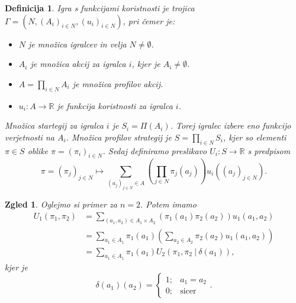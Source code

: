 \documentclass[10pt, a4paper]{article}
\newtheorem{defi}[izr]{Definicija}
\newenvironment{noticeB}{%
  \tcolorbox[%
  notitle,
  empty,
  enhanced,  %
  breakable,
  coltext=black,
  colback=white, 
  fontupper=\rmfamily,
  parbox=false,
  noparskip,
  sharp corners,
  boxrule=-1pt,  %
  frame hidden,
  left=7pt,  %
  right=7pt,
  top=5pt,
  bottom=5pt,
  before skip=2.5ex plus 2pt,
  after skip=2.5ex plus 2pt,
  borderline west = {1.5pt}{-0.1pt}{blue!30!black}, %
  overlay unbroken and last={%
    \draw[color=black, line width=1.25pt]
    ($(frame.south west)+(1.pt, -0.1pt)$) -- ++(2em, 0);
  }
  ]}
{\endtcolorbox}
\newenvironment{definicija}{\begin{defi}\begin{noticeB}}{%
    \end{noticeB}\end{defi}}
\newtheorem{zgled}[izr]{Zgled}
\newcommand{\R}{\mathbb {R}}
\begin{document}
\begin{definicija}
  Igra s funkcijami koristnosti je trojica $\Gamma = (N, (A_i)_{i \in N}, (u_i)_{i \in N})$,
  pri čemer je:
  \begin{itemize}
    \item $N$ je množica igralcev in velja $N \neq \emptyset$.
    \item $A_i$ je množica akcij za igralca $i$, kjer je $A_i \neq \emptyset$.
    \item $A = \prod_{i \in N} A_i$ je množica profilov akcij.
    \item $u_i: A \to \R$ je funkcija koristnosti za igralca $i$.
  \end{itemize}
  Množica startegij za igralca $i$ je $S_i = \Pi (A_i)$.
  Torej igralec izbere eno funkcijo verjetnosti na $A_i$.
  Množica profilov strategij je $S = \prod_{i \in N} S_i$, kjer so elementi $\pi \in S$ oblike $\pi = (\pi_i)_{i \in N}$.
  Sedaj definiramo preslikavo $U_i: S \to \R$ s predpisom 
  $$\pi = (\pi_j)_{j \in N} \mapsto \sum_{(a_j)_{j \in N} \in A} \left(\prod_{j \in N} \pi_j (a_j)\right) u_i ((a_j)_{j \in N}).$$
\end{definicija}

\begin{zgled}
  Oglejmo si primer za $n = 2$. Potem imamo 
  $$$$
  \begin{align*}
    U_1 (\pi_1, \pi_2) &= \sum_{(a_1, a_2) \in A_1 \times A_2} \left( \pi_1 (a_1) \pi_2 (a_2)\right) u_1 (a_1, a_2)\\
    &=\sum_{a_1 \in A_1} \pi_1 (a_1) \left(\sum_{a_2 \in A_2} \pi_2 (a_2) u_1 (a_1, a_2)\right)\\
    &= \sum_{a_1 \in A_1} \pi_1 (a_1) U_2 (\pi_1, \pi_2\ \big|\ \delta(a_1)), 
  \end{align*}
  kjer je $$\delta(a_1) (a_2) = \begin{cases}
    1; & a_1 = a_2\\
    0;& \textrm{sicer}
  \end{cases}.$$
\end{zgled}
\end{document}
